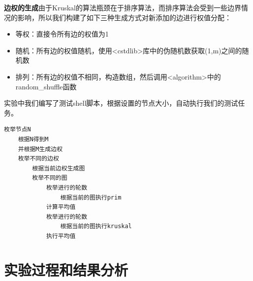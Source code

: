 \documentclass[UTF8]{ctexart}
\begin{document}
\noindent\textbf{边权的生成}\quad 由于Kruskal的算法瓶颈在于排序算法，而排序算法会受到一些边界情况的影响，所以我们构建了如下三种生成方式对新添加的边进行权值分配：
\begin{itemize}
    \item 等权：直接令所有边的权值为1
    \item 随机：所有边的权值随机，使用<cstdlib>库中的伪随机数获取(1,m)之间的随机数
    \item 排列：所有边的权值不相同，构造数组，然后调用<algorithm>中的random\_shuffle函数
\end{itemize}

实验中我们编写了测试shell脚本，根据设置的节点大小，自动执行我们的测试任务。
\begin{lstlisting}
枚举节点N   
	根据N得到M
    并根据M生成边权
    枚举不同的边权
        根据当前边权生成图
		枚举不同的图
			枚举进行的轮数
				根据当前的图执行prim
			计算平均值
			枚举进行的轮数
				根据当前的图执行kruskal
			执行平均值
\end{lstlisting}

\section{实验过程和结果分析}
\end{document}
